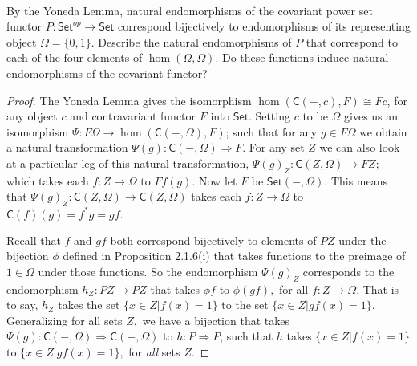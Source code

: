 \documentclass[../../main]{subfiles}
\begin{document}
\paragraph{}
\begin{exercise}
	By the Yoneda Lemma, natural endomorphisms of the covariant power set
	functor \(P\colon\textsf{Set}^{op} \to \textsf{Set}\) correspond
	bijectively to endomorphisms of its representing object \(\Omega = \{0,
	1\}\). Describe the natural endomorphisms of \(P\) that correspond to
	each of the four elements of \(\hom(\Omega, \Omega)\). Do these
	functions induce natural endomorphisms of the covariant functor?	
\end{exercise}

\begin{proof}
	The Yoneda Lemma gives the isomorphism $
	\hom(\mathsf{C}(-,c), F) \cong Fc $, for any object $ c $ and
	contravariant functor $ F $ into $ \mathsf{Set} $. Setting $ c $ to be
	$ \Omega $ gives us an isomorphism $ \Psi\colon F\Omega \to
	\hom(\mathsf{C}(-,\Omega), F) $; such that for any $ g \in F\Omega $ we
	obtain a natural transformation $ \Psi(g)\colon\mathsf{C}(-,\Omega)
	\Rightarrow F. $ For any set $ Z $ we can also look at a particular leg
	of this natural transformation, $ \Psi(g)_Z\colon\mathsf{C}(Z,\Omega) \to
	FZ; $ which takes each $ f\colon Z \to \Omega $ to $ Ff(g). $ Now let $ F $
	be $ \mathsf{Set}(-, \Omega). $ This means that $ \Psi(g)_Z:
	\mathsf{C}(Z,\Omega) \to  \mathsf{C}(Z,\Omega) $ takes each $ f\colon Z \to
	\Omega $ to $ \mathsf{C}(f)(g) = f^*g = gf. $

	Recall that $ f $ and $ gf $ both correspond bijectively to elements of
	$ PZ $ under the bijection $ \phi $ defined in Proposition 2.1.6(i)
	that takes functions to the preimage of $ 1 \in \Omega $ under those
	functions. So the endomorphism $ \Psi(g)_Z $ corresponds to the
	endomorphism $ h_Z\colon PZ \to PZ $ that takes $ \phi f $ to $ \phi (gf), $
	for all $ f\colon Z \to \Omega. $ That is to say, $ h_Z $ takes the set $
	\{x \in Z | f(x) = 1\} $ to the set $ \{x \in Z | gf(x) = 1\}. $
	Generalizing for all sets $ Z, $ we have a bijection that takes $
	\Psi(g)\colon\mathsf{C}(-,\Omega) \Rightarrow \mathsf{C}(-,\Omega) $ to $
	h\colon P \Rightarrow P $, such that $ h $ takes $ \{x \in Z | f(x) = 1\} $
	to $ \{x \in Z | gf(x) = 1\}, $ for \textit{all} sets $ Z. $ 


\end{proof}
\end{document}
